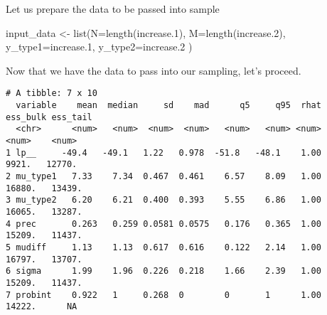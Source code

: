 \documentclass[
  letterpaper,
  DIV=11,
  numbers=noendperiod]{scrreprt}
\newenvironment{Shaded}{\begin{snugshade}}{\end{snugshade}}
\newcommand{\AttributeTok}[1]{\textcolor[rgb]{0.40,0.45,0.13}{#1}}
\newcommand{\CommentTok}[1]{\textcolor[rgb]{0.37,0.37,0.37}{#1}}
\newcommand{\DecValTok}[1]{\textcolor[rgb]{0.68,0.00,0.00}{#1}}
\newcommand{\FloatTok}[1]{\textcolor[rgb]{0.68,0.00,0.00}{#1}}
\newcommand{\FunctionTok}[1]{\textcolor[rgb]{0.28,0.35,0.67}{#1}}
\newcommand{\NormalTok}[1]{\textcolor[rgb]{0.00,0.23,0.31}{#1}}
\newcommand{\OtherTok}[1]{\textcolor[rgb]{0.00,0.23,0.31}{#1}}
\newcommand{\SpecialCharTok}[1]{\textcolor[rgb]{0.37,0.37,0.37}{#1}}
\begin{document}
Let us prepare the data to be passed into sample

\begin{Shaded}
\begin{Highlighting}[]
\NormalTok{input\_data }\OtherTok{\textless{}{-}} \FunctionTok{list}\NormalTok{(}\AttributeTok{N=}\FunctionTok{length}\NormalTok{(increase}\FloatTok{.1}\NormalTok{),}
                   \AttributeTok{M=}\FunctionTok{length}\NormalTok{(increase}\FloatTok{.2}\NormalTok{),}
                   \AttributeTok{y\_type1=}\NormalTok{increase}\FloatTok{.1}\NormalTok{,}
                   \AttributeTok{y\_type2=}\NormalTok{increase}\FloatTok{.2}
\NormalTok{)}
\end{Highlighting}
\end{Shaded}

Now that we have the data to pass into our sampling, let's proceed.

\begin{Shaded}
\end{Shaded}

\begin{Shaded}
\end{Shaded}

\begin{verbatim}
# A tibble: 7 x 10
  variable    mean  median     sd    mad      q5     q95  rhat ess_bulk ess_tail
  <chr>      <num>   <num>  <num>  <num>   <num>   <num> <num>    <num>    <num>
1 lp__     -49.4   -49.1   1.22   0.978  -51.8   -48.1    1.00    9921.   12770.
2 mu_type1   7.33    7.34  0.467  0.461    6.57    8.09   1.00   16880.   13439.
3 mu_type2   6.20    6.21  0.400  0.393    5.55    6.86   1.00   16065.   13287.
4 prec       0.263   0.259 0.0581 0.0575   0.176   0.365  1.00   15209.   11437.
5 mudiff     1.13    1.13  0.617  0.616    0.122   2.14   1.00   16797.   13707.
6 sigma      1.99    1.96  0.226  0.218    1.66    2.39   1.00   15209.   11437.
7 probint    0.922   1     0.268  0        0       1      1.00   14222.      NA 
\end{verbatim}
\end{document}
